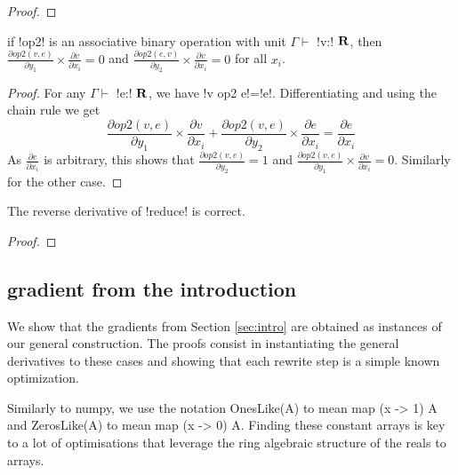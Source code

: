 \begin{proof}
    
\end{proof}

\begin{lemma}
    if !op2! is an associative binary operation with unit $\Gamma \vdash$ !v:! $\mathbf{R}$, then 
    $\frac{\partial op2(v,e)}{\partial y_1}\times\frac{\partial v}{\partial x_i}=0$ 
    and $\frac{\partial op2(e,v)}{\partial y_2}\times\frac{\partial v}{\partial x_i}=0$ for all $x_i$.
\end{lemma}

\begin{proof}
    For any $\Gamma \vdash$ !e:! $\mathbf{R}$, we have !v op2 e!=!e!.
    Differentiating and using the chain rule we get 
    $$\frac{\partial op2(v,e)}{\partial y_1}\times\frac{\partial v}{\partial x_i}
    +\frac{\partial op2(v,e)}{\partial y_2}\times\frac{\partial e}{\partial x_i}
    = \frac{\partial e}{\partial x_i}$$
As $\frac{\partial e}{\partial x_i}$ is arbitrary, 
this shows that $\frac{\partial op2(v,e)}{\partial y_2}=1$ and $\frac{\partial op2(v,e)}{\partial y_1}\times\frac{\partial v}{\partial x_i}=0$.
Similarly for the other case.
\end{proof}

\begin{proposition}
    The reverse derivative of !reduce! is correct.
\end{proposition}

\begin{proof}
    
\end{proof}

\subsection{gradient from the introduction}

We show that the gradients from Section \ref{sec:intro} are obtained as instances of our general construction. 
The proofs consist in instantiating the general derivatives to these cases 
and showing that each rewrite step is a simple known optimization.

Similarly to numpy, we use the notation OnesLike(A) to mean map (x -> 1) A 
and ZerosLike(A) to mean map (x -> 0) A. 
Finding these constant arrays is key to a lot of optimisations that leverage the ring algebraic structure of the reals to arrays.


